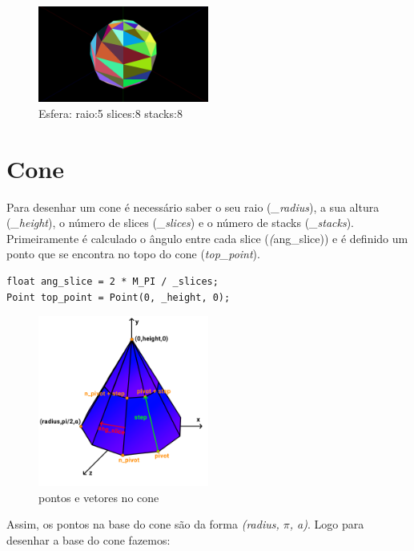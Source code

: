 \documentclass[a4paper]{report}
\begin{document}


\begin{figure}[H]
    \centering 
    \includegraphics[width=0.5\textwidth]{images/sphere.png}  
    \caption{Esfera: raio:5 slices:8 stacks:8}
    \label{fig:cilindro_render}
\end{figure}


\section{Cone}
Para desenhar um cone é necessário saber o seu raio (\textit{\_radius}), a sua
altura (\textit{\_height}), o número de slices (\textit{\_slices}) e o número de
stacks (\textit{\_stacks}).\\
Primeiramente é calculado o ângulo entre cada slice (\textit(ang\_slice))
e é definido um ponto que se encontra no topo do cone (\textit{top\_point}).

\begin{lstlisting}
float ang_slice = 2 * M_PI / _slices;
Point top_point = Point(0, _height, 0);
\end{lstlisting}
\begin{figure}[H]
    \centering 
    \includegraphics[width=0.5\textwidth]{images/cone_vetores.png}  
    \caption{pontos e vetores no cone}
    \label{fig:cone_vetores}
\end{figure}

Assim, os pontos na base do cone são da forma \textit{(radius, $\pi$, a)}.
Logo para desenhar a base do cone fazemos:
\end{document}
